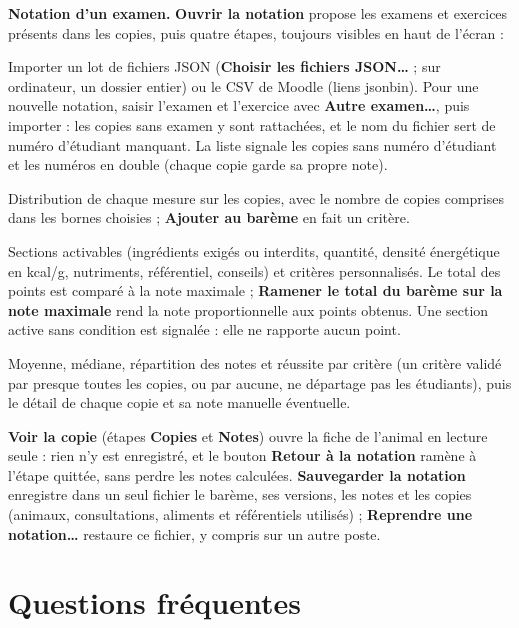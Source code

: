 \documentclass[11pt,a4paper]{article}
\newcommand{\ui}[1]{\textsf{\textbf{#1}}}
\begin{document}
\textbf{Notation d'un examen.} \ui{Ouvrir la notation} propose les examens et exercices présents
dans les copies, puis quatre étapes, toujours visibles en haut de l'écran :
\begin{description}[style=nextline,leftmargin=0pt,itemsep=4pt]
  \item[\ui{Copies}] Importer un lot de fichiers JSON (\ui{Choisir les fichiers JSON…} ; sur
        ordinateur, un dossier entier) ou le CSV de Moodle (liens jsonbin). Pour une nouvelle
        notation, saisir l'examen et l'exercice avec \ui{Autre examen…}, puis importer : les
        copies sans examen y sont rattachées, et le nom du fichier sert de numéro d'étudiant
        manquant. La liste signale les copies sans numéro d'étudiant et les numéros en double
        (chaque copie garde sa propre note).
  \item[\ui{Analyse}] Distribution de chaque mesure sur les copies, avec le nombre de copies
        comprises dans les bornes choisies ; \ui{Ajouter au barème} en fait un critère.
  \item[\ui{Barème}] Sections activables (ingrédients exigés ou interdits, quantité, densité
        énergétique en kcal/g, nutriments, référentiel, conseils) et critères personnalisés. Le
        total des points est comparé à la note maximale ; \ui{Ramener le total du barème sur la
        note maximale} rend la note proportionnelle aux points obtenus. Une section active sans
        condition est signalée : elle ne rapporte aucun point.
  \item[\ui{Notes}] Moyenne, médiane, répartition des notes et réussite par critère (un critère
        validé par presque toutes les copies, ou par aucune, ne départage pas les étudiants),
        puis le détail de chaque copie et sa note manuelle éventuelle.
\end{description}
\ui{Voir la copie} (étapes \ui{Copies} et \ui{Notes}) ouvre la fiche de l'animal en lecture seule :
rien n'y est enregistré, et le bouton \ui{Retour à la notation} ramène à l'étape quittée, sans
perdre les notes calculées. \ui{Sauvegarder la notation} enregistre dans un seul fichier le
barème, ses versions, les notes et les copies (animaux, consultations, aliments et référentiels
utilisés) ; \ui{Reprendre une notation…} restaure ce fichier, y compris sur un autre poste.

\appendix

\section{Questions fréquentes}
\end{document}
